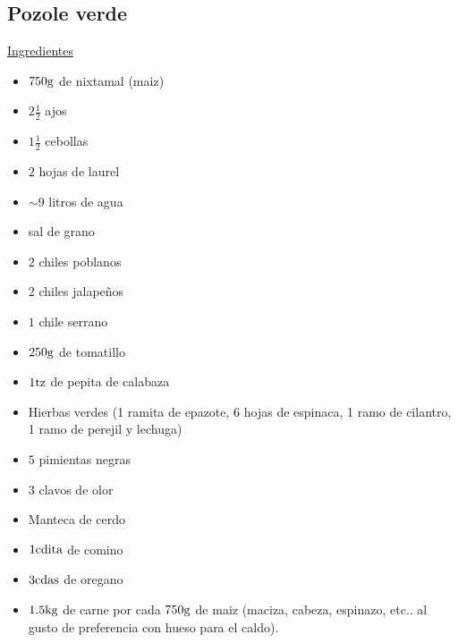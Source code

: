 \subsection{Pozole verde}

\underline{Ingredientes}
\begin{itemize}
\item $750 \rm{g}$ de nixtamal (maiz)
\item $2 \frac{1}{2}$ ajos
\item $1 \frac{1}{2}$ cebollas
\item $2$ hojas de laurel 
\item $\sim 9$ litros de agua
\item sal de grano
\item $2$ chiles poblanos
\item $2$ chiles jalapeños
\item $1$ chile serrano
\item $250 \rm{g}$ de tomatillo
\item $1 \rm{tz}$ de pepita de calabaza
\item Hierbas verdes (1 ramita de epazote, 6 hojas de espinaca, 1 ramo de cilantro, 1 ramo de perejil y lechuga)
\item $5$ pimientas negras
\item $3$ clavos de olor
\item Manteca de cerdo
\item $1 \rm{cdita}$ de comino
\item $3 \rm{cdas}$ de oregano
\item $1.5 \rm{kg}$ de carne por cada $750 \rm{g}$ de maiz (maciza, cabeza, espinazo, etc.. al gusto de preferencia con hueso para el caldo).
\end{itemize}

